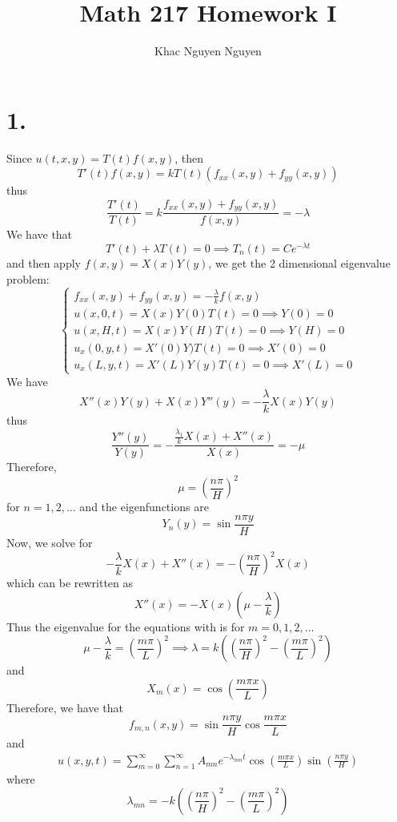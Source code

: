 \documentclass[11pt]{article}
\title{\textbf{Math 217 Homework I}}
\author{Khac Nguyen Nguyen}
\date{}
\theoremstyle{mystyle}
\theoremstyle{definition}
\begin{document}
\section*{1.}
Since $u(t, x, y) = T(t) f(x, y)$, then 
\[
  T'(t) f(x,y) = k T(t) (f_{xx}(x,y) + f_{yy}(x,y))
\]
thus 
\[
  \displaystyle\frac{T'(t)}{T(t)} = k\displaystyle\frac{ f_{xx}(x,y) + f_{yy}(x,y)}{f(x,y)} = -\lambda
\]
We have that 
\[
  T'(t) + \lambda T(t) = 0 \implies T_n(t) = Ce^{-\lambda t}
\]
and then apply $f(x,y) = X(x) Y(y)$, we get the 2 dimensional eigenvalue problem: 
\[
  \begin{cases}  
    f_{xx}(x,y) + f_{yy}(x,y) = -\displaystyle\frac{\lambda}{k} f(x,y) \\
    u(x,0,t) = X(x) Y(0) T(t) = 0 \implies Y(0) = 0 \\  
  u(x,H,t) = X(x) Y(H) T(t) = 0 \implies Y(H) = 0 \\ 
  u_x(0,y,t) = X'(0) Y) T(t) = 0 \implies X'(0) = 0 \\ 
  u_x(L,y,t) = X'(L) Y(y) T(t) = 0 \implies X'(L) = 0
  \end{cases}
\]
We have 
\[
  X''(x)Y(y) + X(x)Y''(y) = -\displaystyle\frac{\lambda}{k} X(x)Y(y)
\]
thus 
\[
  \displaystyle\frac{Y''(y)}{Y(y)}= -\displaystyle\frac{\displaystyle\frac{\lambda_1}{k} X(x)+ X''(x)}{X(x)} = - \mu 
\]
Therefore,  
\[
  \mu = \left(\displaystyle\frac{n\pi}{H} \right)^2
\]
for $n = 1,2, \hdots$ and the eigenfunctions are
\[
  Y_n(y) = \sin \displaystyle\frac{n\pi y}{H}
\]
Now, we solve for 
\[
  -\displaystyle\frac{\lambda}{k} X(x) + X''(x) = - \left(\displaystyle\frac{n\pi}{H}\right)^2 X(x)
\]
which can be rewritten as 
\[
  X''(x) = -X(x) \left(\mu -\displaystyle\frac{\lambda}{k} \right) 
\] 
Thus the eigenvalue for the equations with is for $m = 0,1,2, \hdots$
\[
  \mu - \displaystyle\frac{\lambda}{k} = \left( \displaystyle\frac{m \pi}{L}\right)^2  \implies \lambda = k \left( \left(\displaystyle\frac{n\pi}{H}\right)^2 - \left(\displaystyle\frac{m\pi}{L}\right)^2 \right)
\]
and 
\[
  X_m(x) = \cos\left(\displaystyle\frac{m\pi x}{L}\right)
\]
Therefore, we have that 
\[
  f_{m,n}(x,y) = \sin \displaystyle\frac{n\pi y}{H} \cos \displaystyle\frac{m\pi x}{L}
\]
and 
\begin{align*}
  u(x,y,t) = \sum_{m=0}^\infty \sum_{n=1}^\infty A_{mn} e^{-\lambda_{mn}t} \cos \left( \displaystyle\frac{m\pi x}{L}\right) \sin\left(\displaystyle\frac{n\pi y}{H}\right)
\end{align*}
where 
\[
  \lambda_{mn} = -k \left( \left(\displaystyle\frac{n\pi}{H}\right)^2 - \left(\displaystyle\frac{m\pi}{L}\right)^2\right) 
\]
\end{document}

